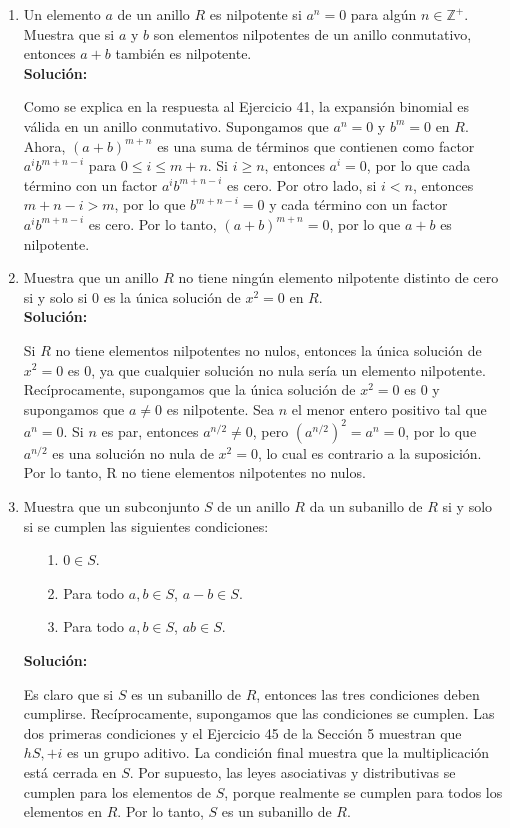 \begin{enumerate}
	
	\item  Un elemento $a$ de un anillo $R$ es nilpotente si $a^n = 0$ para algún $n \in \mathbb{Z}^+$. Muestra que si $a$ y $b$ son elementos nilpotentes de un anillo conmutativo, entonces $a + b$ también es nilpotente.
	\\ \textbf{Solución:}
	
	Como se explica en la respuesta al Ejercicio 41, la expansión binomial es válida en un anillo conmutativo. Supongamos que $a^n = 0$ y $b^m = 0$ en $R$. Ahora, $(a + b)^{m+n}$ es una suma de términos que contienen como factor $a^i b^{m+n-i}$ para $0 \leq i \leq m + n$. Si $i \geq n$, entonces $a^i = 0$, por lo que cada término con un factor $a^i b^{m+n-i}$ es cero. Por otro lado, si $i < n$, entonces $m + n - i > m$, por lo que $b^{m+n-i} = 0$ y cada término con un factor $a^i b^{m+n-i}$ es cero. Por lo tanto, $(a + b)^{m+n} = 0$, por lo que $a + b$ es nilpotente.
	
	\item  Muestra que un anillo $R$ no tiene ningún elemento nilpotente distinto de cero si y solo si $0$ es la única solución de $x^2 = 0$ en $R$.
	\\ \textbf{Solución:}
	
	Si $R$ no tiene elementos nilpotentes no nulos, entonces la única solución de $x^2 = 0$ es $0$, ya que cualquier solución no nula sería un elemento nilpotente. Recíprocamente, supongamos que la única solución de $x^2 = 0$ es $0$ y supongamos que $a \neq 0$ es nilpotente. Sea $n$ el menor entero positivo tal que $a^n = 0$. Si $n$ es par, entonces $a^{n/2} \neq 0$, pero $(a^{n/2})^2 = a^n = 0$, por lo que $a^{n/2}$ es una solución no nula de $x^2 = 0$, lo cual es contrario a la suposición. Por lo tanto, R no tiene elementos nilpotentes no nulos.
	\item  Muestra que un subconjunto $S$ de un anillo $R$ da un subanillo de $R$ si y solo si se cumplen las siguientes condiciones:
	\begin{itemize}
		\item[1.] $0 \in S$.
		\item[2.] Para todo $a, b \in S$, $a - b \in S$.
		\item[3.] Para todo $a, b \in S$, $ab \in S$.
	\end{itemize}
	\textbf{Solución:}
	
	Es claro que si $S$ es un subanillo de $R$, entonces las tres condiciones deben cumplirse. Recíprocamente, supongamos que las condiciones se cumplen. Las dos primeras condiciones y el Ejercicio 45 de la Sección 5 muestran que $hS, +i$ es un grupo aditivo. La condición final muestra que la multiplicación está cerrada en $S$. Por supuesto, las leyes asociativas y distributivas se cumplen para los elementos de $S$, porque realmente se cumplen para todos los elementos en $R$. Por lo tanto, $S$ es un subanillo de $R$.
	

\end{enumerate}
